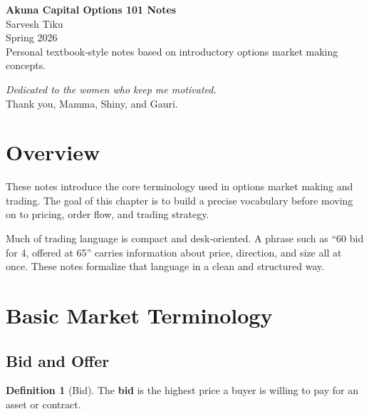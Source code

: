 \documentclass[11pt]{article}
\theoremstyle{definition}
\newtheorem{definition}{Definition}[section]
\begin{document}
\begin{titlepage}
    \centering
    \vspace*{2cm}
    {\Huge \textbf{Akuna Capital Options 101 Notes}}\\[0.5cm]
    {\large Sarvesh Tiku}\\[0.3cm]
    {\large Spring 2026}\\[2cm]

    \vfill
    {\large Personal textbook-style notes based on introductory options market making concepts.}
\end{titlepage}

\clearpage
\thispagestyle{empty}

\vspace*{\fill}
\begin{center}
    {\Large \textit{Dedicated to the women who keep me motivated.}}\\[1cm]
    {\large Thank you, Mamma, Shiny, and Gauri.}
\end{center}
\vspace*{\fill}

\clearpage

\tableofcontents
\newpage

\section{Overview}

These notes introduce the core terminology used in options market making and trading. The goal of this chapter is to build a precise vocabulary before moving on to pricing, order flow, and trading strategy.

Much of trading language is compact and desk-oriented. A phrase such as ``60 bid for 4, offered at 65'' carries information about price, direction, and size all at once. These notes formalize that language in a clean and structured way.

\section{Basic Market Terminology}

\subsection{Bid and Offer}

\begin{definition}[Bid]
The \textbf{bid} is the highest price a buyer is willing to pay for an asset or contract.
\end{definition}
\end{document}
